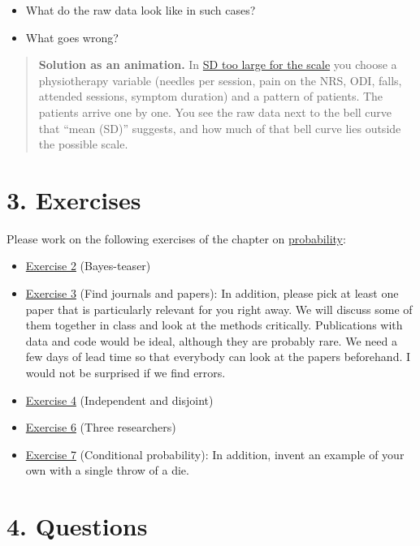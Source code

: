 \documentclass[
]{book}
\providecommand{\tightlist}{%
  \setlength{\itemsep}{0pt}\setlength{\parskip}{0pt}}
\begin{document}
\begin{itemize}
\tightlist
\item
  What do the raw data look like in such cases?
\item
  What goes wrong?
\end{itemize}

\begin{quote}
\textbf{Solution as an animation.} In
\href{https://jdegenfellner.github.io/Script_QM1_ZHAW/animations/18_SD_zu_gross_fuer_die_Skala.html}{SD too large for the scale}
you choose a physiotherapy variable (needles per session, pain on the NRS, ODI, falls, attended sessions, symptom duration)
and a pattern of patients. The patients arrive one by one. You see the raw data next to the bell curve that
``mean (SD)'' suggests, and how much of that bell curve lies outside the possible scale.
\end{quote}

\section*{3. Exercises}\label{exercises-1}

Please work on the following exercises of the chapter on \hyperref[probs]{probability}:

\begin{itemize}
\tightlist
\item
  \hyperref[exercise2]{Exercise 2} (Bayes-teaser)
\item
  \hyperref[exercise3]{Exercise 3} (Find journals and papers): In addition, please pick at least one paper that is particularly relevant for you right away.
  We will discuss some of them together in class and look at the methods critically.
  Publications with data and code would be ideal, although they are probably rare.
  We need a few days of lead time so that everybody can look at the papers beforehand.
  I would not be surprised if we find errors.
\item
  \hyperref[exercise4]{Exercise 4} (Independent and disjoint)
\item
  \hyperref[exercise6]{Exercise 6} (Three researchers)
\item
  \hyperref[exercise7]{Exercise 7} (Conditional probability): In addition, invent an example of your own with a single throw of a die.
\end{itemize}

\section*{4. Questions}\label{questions}
\end{document}
